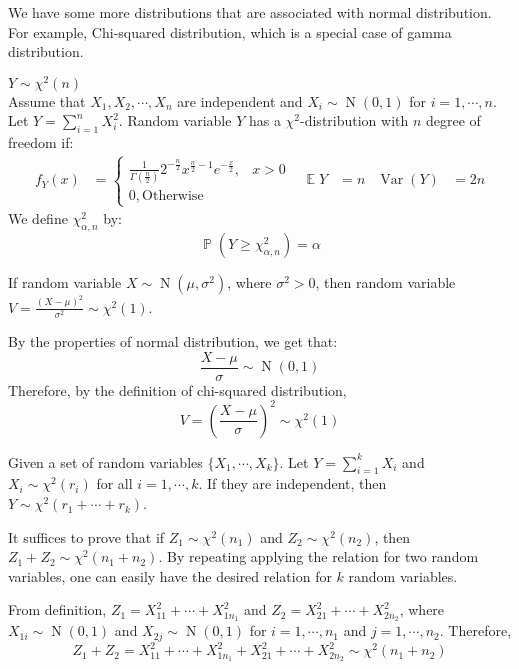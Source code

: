 \documentclass{huhtakm-template-book-v2}
\DeclareMathOperator{\prob}{\mathbb{P}}
\DeclareMathOperator{\E}{\mathbb{E}}
\DeclareMathOperator{\Var}{Var}
\DeclareMathOperator{\N}{N}
\begin{document}
We have some more distributions that are associated with normal distribution. For example, Chi-squared distribution, which is a special case of gamma distribution.
\begin{eg} $Y\sim\chi^{2}(n)$\\
	Assume that $X_{1},X_{2},\cdots,X_{n}$ are independent and $X_{i}\sim\N(0,1)$ for $i=1,\cdots,n$. Let $Y=\sum_{i=1}^{n}X_{i}^{2}$. Random variable $Y$ has a $\chi^{2}$-distribution with $n$ degree of freedom if:
	\begin{align*}
		f_{Y}(x)&=\begin{cases}
			\frac{1}{\Gamma(\frac{n}{2})}2^{-\frac{n}{2}}x^{\frac{n}{2}-1}e^{-\frac{x}{2}}, &x>0\\
			0, \text{Otherwise}
		\end{cases} & \E{Y}&=n & \Var(Y)&=2n
	\end{align*}
	We define $\chi^{2}_{\alpha,n}$ by:
	\begin{equation*}
		\prob(Y\geq\chi^{2}_{\alpha,n})=\alpha
	\end{equation*}
\end{eg} 
\begin{thm}
	\label{Chapter 1 (Theorem) chi-square distribution with 1 degree of freedom}
	If random variable $X\sim\N(\mu,\sigma^{2})$, where $\sigma^{2}>0$, then random variable $V=\frac{(X-\mu)^{2}}{\sigma^{2}}\sim\chi^{2}(1)$.
\end{thm}
\begin{proofing}
	By the properties of normal distribution, we get that:
	\begin{equation*}
		\frac{X-\mu}{\sigma}\sim\N(0,1)
	\end{equation*}
	Therefore, by the definition of chi-squared distribution,
	\begin{equation*}
		V=\left(\frac{X-\mu}{\sigma}\right)^{2}\sim\chi^{2}(1)
	\end{equation*}
\end{proofing}
\begin{thm}
	Given a set of random variables $\{X_{1},\cdots,X_{k}\}$. Let $Y=\sum_{i=1}^{k}X_{i}$ and $X_{i}\sim\chi^{2}(r_{i})$ for all $i=1,\cdots,k$. If they are independent, then $Y\sim\chi^{2}(r_{1}+\cdots+r_{k})$.
\end{thm}
\begin{proofing}
	It suffices to prove that if $Z_{1}\sim\chi^{2}(n_{1})$ and $Z_{2}\sim\chi^{2}(n_{2})$, then $Z_{1}+Z_{2}\sim\chi^{2}(n_{1}+n_{2})$. By repeating applying the relation for two random variables, one can easily have the desired relation for $k$ random variables.
	
	From definition, $Z_{1}=X_{11}^{2}+\cdots+X_{1n_{1}}^{2}$ and $Z_{2}=X_{21}^{2}+\cdots+X_{2n_{2}}^{2}$, where $X_{1i}\sim\N(0,1)$ and $X_{2j}\sim\N(0,1)$ for $i=1,\cdots,n_{1}$ and $j=1,\cdots,n_{2}$. Therefore,
	\begin{equation*}
		Z_{1}+Z_{2}=X_{11}^{2}+\cdots+X_{1n_{1}}^{2}+X_{21}^{2}+\cdots+X_{2n_{2}}^{2}\sim\chi^{2}(n_{1}+n_{2})
	\end{equation*}
\end{proofing}
\end{document}
